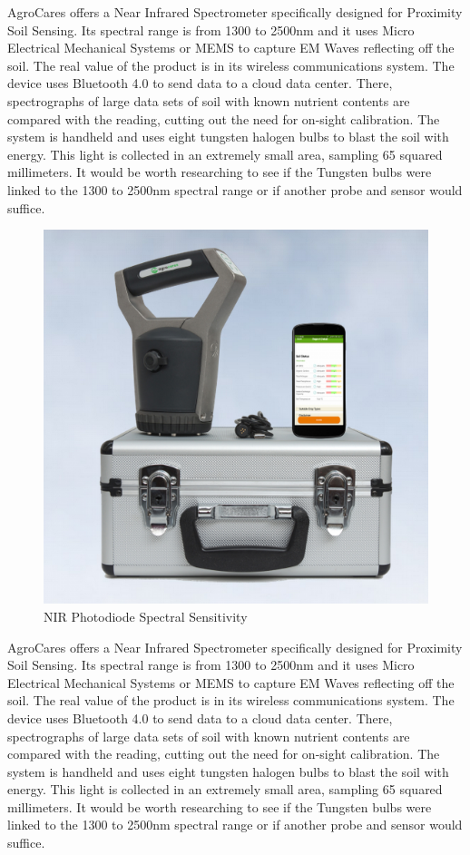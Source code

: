 AgroCares offers a Near Infrared Spectrometer specifically designed for Proximity Soil Sensing. Its spectral range is from 1300 to 2500nm and it uses Micro Electrical Mechanical Systems or MEMS to capture EM Waves reflecting off the soil. The real value of the product is in its wireless communications system. The device uses Bluetooth 4.0 to send data to a cloud data center. There, spectrographs of large data sets of soil with known nutrient contents are compared with the reading, cutting out the need for on-sight calibration. The system is handheld and uses eight tungsten halogen bulbs to blast the soil with energy. This light is collected in an extremely small area, sampling 65 squared millimeters. It would be worth researching to see if the Tungsten bulbs were linked to the 1300 to 2500nm spectral range or if another probe and sensor would suffice.
\begin{figure}[H]
    \caption{NIR Photodiode Spectral Sensitivity}
    \centering
    \includegraphics[width=\textwidth]{images/3-2-2Pic.png}
\end{figure}

AgroCares offers a Near Infrared Spectrometer specifically designed for Proximity Soil Sensing. Its spectral range is from 1300 to 2500nm and it uses Micro Electrical Mechanical Systems or MEMS to capture EM Waves reflecting off the soil. The real value of the product is in its wireless communications system. The device uses Bluetooth 4.0 to send data to a cloud data center. There, spectrographs of large data sets of soil with known nutrient contents are compared with the reading, cutting out the need for on-sight calibration. The system is handheld and uses eight tungsten halogen bulbs to blast the soil with energy. This light is collected in an extremely small area, sampling 65 squared millimeters. It would be worth researching to see if the Tungsten bulbs were linked to the 1300 to 2500nm spectral range or if another probe and sensor would suffice.


